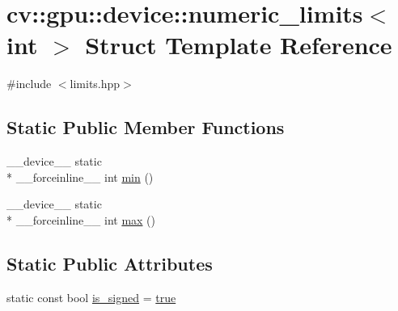 \hypertarget{structcv_1_1gpu_1_1device_1_1numeric__limits_3_01int_01_4}{\section{cv\-:\-:gpu\-:\-:device\-:\-:numeric\-\_\-limits$<$ int $>$ Struct Template Reference}
\label{structcv_1_1gpu_1_1device_1_1numeric__limits_3_01int_01_4}
}


{\ttfamily \#include $<$limits.\-hpp$>$}

\subsection*{Static Public Member Functions}
\begin{DoxyCompactItemize}
\item 
\-\_\-\-\_\-device\-\_\-\-\_\- static \\*
\-\_\-\-\_\-forceinline\-\_\-\-\_\- int \hyperlink{structcv_1_1gpu_1_1device_1_1numeric__limits_3_01int_01_4_a7f793a285f69dd240fd7e4572da155f1}{min} ()
\item 
\-\_\-\-\_\-device\-\_\-\-\_\- static \\*
\-\_\-\-\_\-forceinline\-\_\-\-\_\- int \hyperlink{structcv_1_1gpu_1_1device_1_1numeric__limits_3_01int_01_4_a2e2ce6ade0458870fb1e54037350c5d7}{max} ()
\end{DoxyCompactItemize}
\subsection*{Static Public Attributes}
\begin{DoxyCompactItemize}
\item 
static const bool \hyperlink{structcv_1_1gpu_1_1device_1_1numeric__limits_3_01int_01_4_af965f3054cdb0e81265f71161434f5ec}{is\-\_\-signed} = \hyperlink{namespacecv_1_1gpu_1_1device_ac34c172a7a1904fb0fd477321a31f926}{true}
\end{DoxyCompactItemize}


